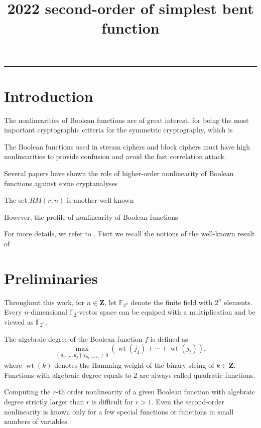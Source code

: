\documentclass{article}
\title{ 2022 second-order of simplest \mathcal{PS} bent function}
\newcommand{\Z}{\mathbf{Z}}
\newcommand{\F}{\mathbb{F}}
\newcommand{\0}{\textbf{0}}
\newcommand{\1}{\textbf{1}}
\theoremstyle{plain}
\theoremstyle{nonumberplain}
\begin{document}
  \noindent
  \rule{\linewidth}{0.4pt}


\section{Introduction}
    The nonlinearities of Boolean functions are of great interest, for being the most important cryptographic 
    criteria for the symmetric cryptography, which is 
    
    The Boolean functions used in stream ciphers and block ciphers must have high nonlinearities to provide confusion and avoid the fast correlation attack. 
    
    Several papers have shown the role of higher-order nonlinearity of Boolean functions against some 
    cryptanalyses 

    The set $ RM(r,n) $ is another well-known  
    
    However, the profile of nonlinearity of Boolean functions 

    For more details, we refer to .
    Fisrt we recall the notions of the well-known result of 


\section{Preliminaries}

    Throughout this work, for $ n\in\Z $, let $ \F_{2^n} $ denote the finite field with $ 2^n $ elements.
    Every $ n $-dimensional $ \F_2 $-vector space can be equiped with a multiplication and be viewed as 
    $ \F_{2^n} $. 

    The algebraic degree of the Boolean function $ f $   is defined as 
    \[\max_{(u_1,...,u_j)|c_{u_1,\dots,u_j}\ne 0}\left( \operatorname{wt}(j_1)+\cdots+\operatorname{wt}(j_t) \right),\]
    where $ \operatorname{wt}(k) $ denotes the Hamming weight of the binary string of $ k\in\Z $. 
    Functions with algebraic degree equals to $ 2 $ are always called quadratic functions. 

    Computing the $ r $-th order nonlinearity of a given Boolean function with algebraic
    degree strictly larger than $ r $ is difficult for $ r > 1 $. 
    Even the second-order nonlinearity is known only for a few special functions or functions in small 
    numbers of variables. 
\end{document}
